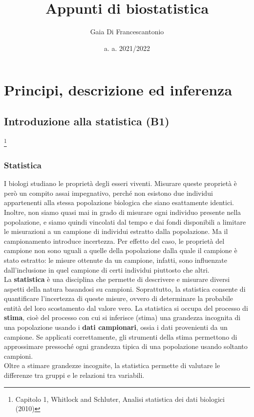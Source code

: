 \documentclass[10pt, draft]{book}
\title{\Huge{\textbf{Appunti di biostatistica}}}
\author{\Large{Gaia Di Francescantonio}}
\date{a. a. 2021/2022}
\begin{document}
\maketitle
\tableofcontents

\part{Principi, descrizione ed inferenza}

\chapter{Introduzione alla statistica (B1)} \footnote{Capitolo 1, Whitlock and Schluter, Analisi statistica dei dati biologici (2010)}


\section{Statistica}
I biologi studiano le proprietà degli esseri viventi. Misurare queste proprietà è però un compito assai impegnativo, perché non esistono due individui appartenenti alla stessa popolazione biologica che siano esattamente identici. Inoltre, non siamo quasi mai in grado di misurare ogni individuo presente nella popolazione, e siamo quindi vincolati dal tempo e dai fondi disponibili a limitare le misurazioni a un campione di individui estratto dalla popolazione. Ma il campionamento introduce incertezza. Per effetto del caso, le proprietà del campione non sono uguali a quelle della popolazione dalla quale il campione è stato estratto: le misure ottenute da un campione, infatti, sono influenzate dall'inclusione in quel campione di certi individui piuttosto che altri.
\\
La \textbf{statistica} è una disciplina che permette di descrivere e misurare diversi aspetti della natura basandosi su campioni. Soprattutto, la statistica consente di quantificare l'incertezza di queste misure, ovvero di determinare la probabile entità del loro scostamento dal valore vero. La statistica si occupa del processo di \textbf{stima}, cioè del processo con cui si inferisce (stima) una grandezza incognita di una popolazione usando i \textbf{dati campionari}, ossia i dati provenienti da un campione. Se applicati correttamente, gli strumenti della stima permettono di approssimare pressoché ogni grandezza tipica di una popolazione usando soltanto campioni.
\\
Oltre a stimare grandezze incognite, la statistica permette di valutare le differenze tra gruppi e le relazioni tra variabili.
\end{document}

